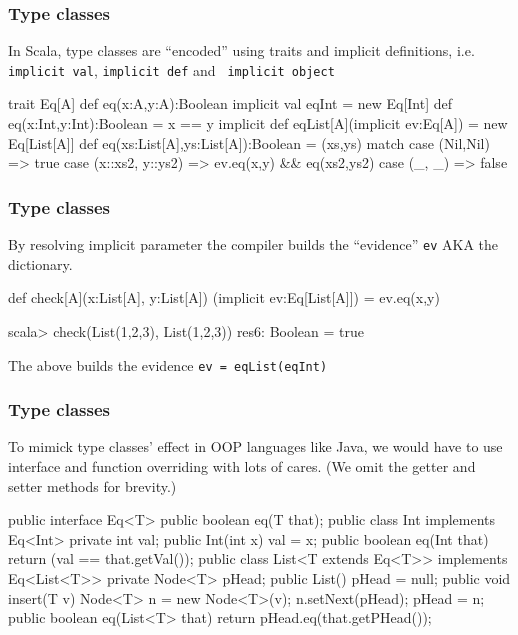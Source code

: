 \documentclass{beamer}
\newcommand{\beb}{\begin{exampleblock}}
\newcommand{\eeb}{\end{exampleblock}}
\begin{document}
\begin{frame}[fragile]
\frametitle{Type classes}
In Scala, type classes are ``encoded'' using traits and implicit
definitions, i.e. {\tt implicit val}, {\tt implicit def} and {\tt
  implicit object}
\beb{}
\begin{code}
trait Eq[A] {  def eq(x:A,y:A):Boolean }
implicit val eqInt = new Eq[Int] {
    def eq(x:Int,y:Int):Boolean =  x == y
}
implicit def eqList[A](implicit ev:Eq[A]) = 
  new Eq[List[A]] {
    def eq(xs:List[A],ys:List[A]):Boolean = 
      (xs,ys) match {
        case (Nil,Nil) => true
        case (x::xs2, y::ys2) => ev.eq(x,y) && eq(xs2,ys2)
        case (_, _) => false
     }
}
\end{code}
\eeb
\end{frame}
\begin{frame}[fragile]
\frametitle{Type classes}
By resolving implicit parameter the compiler builds the ``evidence''
{\tt ev} AKA the dictionary.
\beb{}
\begin{code}
def check[A](x:List[A], y:List[A])
   (implicit ev:Eq[List[A]]) = ev.eq(x,y) 
\end{code}
\eeb
\begin{code}
scala> check(List(1,2,3), List(1,2,3))
res6: Boolean = true
\end{code}
The above builds the evidence {\tt ev = eqList(eqInt)}

\end{frame}
\begin{frame}[fragile]
\frametitle{Type classes}
To mimick type classes' effect in OOP
languages like Java, we would have to use
interface and function overriding with lots of cares. (We omit the
getter and setter methods for brevity.)
{\scriptsize
\beb{}
\begin{code}
public interface Eq<T> { public boolean eq(T that); }
public class Int implements Eq<Int> {
  private int val;
  public Int(int x) { val = x; }
  public boolean eq(Int that) {
    return (val == that.getVal());
  } 
}
public class List<T extends Eq<T>> implements Eq<List<T>> {
  private Node<T> pHead; 
  public List() { pHead = null;}
  public void insert(T v) {
    Node<T> n = new Node<T>(v);
    n.setNext(pHead);
    pHead = n;
  }
  public boolean eq(List<T> that) {
    return pHead.eq(that.getPHead());
  }
}
\end{code}
\eeb
}
\end{frame}
\end{document}
